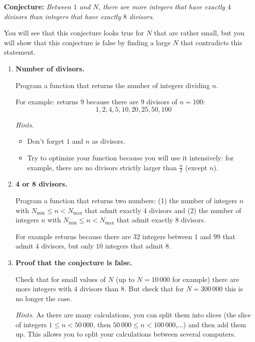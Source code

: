 \documentclass[11pt,class=report,crop=false]{standalone}
\begin{document}
\begin{activite}


\textbf{Conjecture: } \emph{Between $1$ and $N$, there are more integers that have exactly $4$ divisors than integers that have exactly $8$ divisors.}

You will see that this conjecture looks true for $N$ that are rather small, but you will show that this conjecture is false by finding a large $N$ that contradicts this statement.

\begin{enumerate}
  \item \textbf{Number of divisors.}
  
  Program a  function that returns the number of integers dividing $n$.
  
  For example:  returns $9$ because there are $9$ divisors of $n=100$:
  $$1,2,4,5,10,20,25,50,100$$
  
  \emph{Hints.}
  \begin{itemize}
    \item Don't forget $1$ and $n$ as divisors.
    \item Try to optimize your function because you will use it intensively: for example, there are no divisors strictly larger than $\frac n2$ (except $n$).    
   \end{itemize}
   
   
   \item \textbf{4 or 8 divisors.}
   
   Program a  function that returns two numbers: (1) the number of integers $n$ with $N_{\text{min}} \le n < N_{\text{max}}$ that admit exactly $4$ divisors and (2) the number of integers $n$ with $N_{\text{min}} \le n < N_{\text{max}}$ that admit exactly $8$ divisors.
   
   For example  returns  because there are $32$ integers between $1$ and $99$ that admit $4$ divisors, but only $10$ integers that admit $8$.
   
   \item \textbf{Proof that the conjecture is false.}
   
   Check that for \og{}small\fg{} values of $N$ (up to $N = 10\,000$ for example) there are more integers with $4$ divisors than $8$. But check that for $N=300\,000$ this is no longer the case.
   
   \emph{Hints.} As there are many calculations, you can split them into slices (the slice of integers $1\le n < 50\,000$, then $50\,000 \le n < 100\,000$,...) and then add them up.
   This allows you to split your calculations between several computers.
   
\end{enumerate}   
     
\end{activite}
\end{document}
